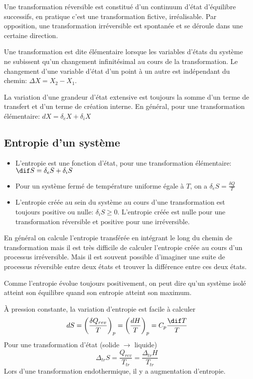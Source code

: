 Une transformation réversible est constitué d'un continuum d'état d'équilibre
successifs, en pratique c'est une transformation fictive, irréalisable.
Par opposition, une transformation irréversible est spontanée et
se déroule dans une certaine direction.

Une transformation est dite élémentaire lorsque les variables d'états
du système ne subissent qu'un changement infinitésimal
au cours de la transformation.
Le changement d'une variable d'état d'un point à un autre est
indépendant du chemin: $\Delta X = X_2 - X_1$.

La variation d'une grandeur d'état extensive est toujours
la somme d'un terme de transfert et d'un terme de création interne.
En général, pour une transformation élémentaire: $dX = \delta_eX+\delta_iX$
\subsection{Entropie d'un système}
\begin{itemize}
  \item L'entropie est une fonction d'état, pour une transformation élémentaire:
    $\dif S = \delta_eS+\delta_iS$
  \item Pour un système fermé de température uniforme égale à $T$,
    on a $\delta_eS = \frac {\delta Q}T$
  \item L'entropie créée au sein du système au cours d'une transformation est
    toujours positive ou nulle: $\delta_iS \geqslant 0$.
    L'entropie créée est nulle pour une transformation réversible et
    positive pour une irréversible.
\end{itemize}
En général on calcule l'entropie transférée en intégrant
le long du chemin de transformation mais il est très difficile de
calculer l'entropie créée au cours d'un processus irréversible.
Mais il est souvent possible d'imaginer une suite de processus réversible
entre deux états et trouver la différence entre ces deux états.

Comme l'entropie évolue toujours positivement,
on peut dire qu'un système isolé atteint son équilibre
quand son entropie atteint son maximum.

À pression constante, la variation d'entropie est facile à calculer
\[ dS = \left(\frac{\delta Q_{rev}}{T}\right)_p =
\left(\frac{dH}{T}\right)_p = C_p\frac{\dif T}{T} \]
Pour une transformation d'état (solide $\longrightarrow$ liquide)
\[ \Delta_{tr}S = \frac{Q_{rev}}{T_{tr}} = \frac{\Delta_{tr}H}{T_{tr}} \]
Lors d'une transformation endothermique, il y a augmentation d'entropie.


